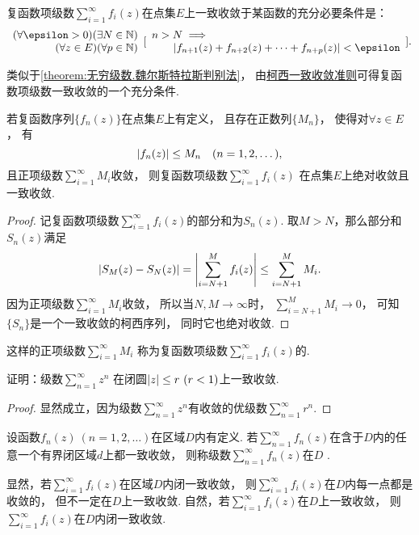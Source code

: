 \begin{theorem}[柯西一致收敛准则]\label{theorem:无穷级数.柯西一致收敛准则}
复函数项级数\(\sum_{i=1}^\infty f_i(z)\)在点集\(E\)上一致收敛于某函数的充分必要条件是：\[
	\begin{array}{r}
		(\forall\epsilon>0)
		(\exists N \in \mathbb{N}) \\
		(\forall z \in E)
		(\forall p \in \mathbb{N})
	\end{array}
	[
		\begin{array}{l}
			n > N \implies \\
			\hspace{20pt}
			\abs{f_{n+1}(z) + f_{n+2}(z) + \dotsb + f_{n+p}(z)} < \epsilon
		\end{array}
	].
\]
\end{theorem}

类似于\cref{theorem:无穷级数.魏尔斯特拉斯判别法}，
由\hyperref[theorem:无穷级数.柯西一致收敛准则]{柯西一致收敛准则}可得复函数项级数一致收敛的一个充分条件.
\begin{corollary}\label{theorem:无穷级数.优级数准则}
若复函数序列\(\{f_n(z)\}\)在点集\(E\)上有定义，
且存在正数列\(\{M_n\}\)，
使得对\(\forall z \in E\)，
有\[
	\abs{f_n(z)} \leq M_n
	\quad(n=1,2,\dotsc),
\]
且正项级数\(\sum_{i=1}^\infty M_i\)收敛，
则复函数项级数\(\sum_{i=1}^\infty f_i(z)\)
在点集\(E\)上绝对收敛且一致收敛.
\begin{proof}
记复函数项级数\(\sum_{i=1}^\infty f_i(z)\)的部分和为\(S_n(z)\).
取\(M > N\)，那么部分和\(S_n(z)\)满足\[
	\abs{S_M(z) - S_N(z)}
	= \abs{\sum_{i=N+1}^M f_i(z)}
	\leq \sum_{i=N+1}^M M_i.
\]
因为正项级数\(\sum_{i=1}^\infty M_i\)收敛，
所以当\(N,M \to \infty\)时，
\(\sum_{i=N+1}^M M_i \to 0\)，
可知\(\{S_n\}\)是一个一致收敛的柯西序列，
同时它也绝对收敛.
\end{proof}
\end{corollary}
这样的正项级数\(\sum_{i=1}^\infty M_i\)
称为复函数项级数\(\sum_{i=1}^\infty f_i(z)\)的.

\begin{example}
证明：级数\(\sum_{n=1}^\infty z^n\)
在闭圆\(\abs{z} \leq r\ (r<1)\)上一致收敛.
\begin{proof}
显然成立，因为级数\(\sum_{n=1}^\infty z^n\)有收敛的优级数\(\sum_{n=1}^\infty r^n\).
\end{proof}
\end{example}

\begin{definition}
设函数\(f_n(z)\ (n=1,2,\dots)\)在区域\(D\)内有定义.
若\(\sum_{n=1}^\infty f_n(z)\)在含于\(D\)内的任意一个有界闭区域\(d\)上都一致收敛，
则称级数\(\sum_{n=1}^\infty f_n(z)\)在\(D\) .
\end{definition}
显然，若\(\sum_{i=1}^\infty f_i(z)\)在区域\(D\)内闭一致收敛，
则\(\sum_{i=1}^\infty f_i(z)\)在\(D\)内每一点都是收敛的，
但不一定在\(D\)上一致收敛.
自然，若\(\sum_{i=1}^\infty f_i(z)\)在\(D\)上一致收敛，
则\(\sum_{i=1}^\infty f_i(z)\)在\(D\)内闭一致收敛.

